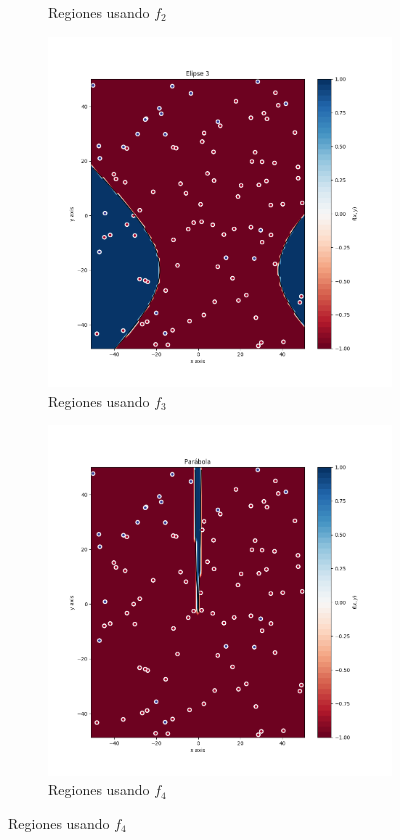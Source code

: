 \documentclass[
  a4paper,
  spanish,
  12pt,
  enlargefirstpage,
]{scrartcl}
\begin{document}
\begin{figure}
\begin{subfigure}{.5\textwidth}
  \caption{Regiones usando \(f_2\)}
  \label{fig:sub2}
\end{subfigure}
\begin{subfigure}{0.5\textwidth}
  \centering
  \includegraphics[width=\linewidth]{img/RegElipse3.png}
  \caption{Regiones usando \(f_3\)}
  \label{fig:sub3}
\end{subfigure}%
\begin{subfigure}{.5\textwidth}
  \centering
  \includegraphics[width=\linewidth]{img/RegParabola.png}
  \caption{Regiones usando \(f_4\)}
  \label{fig:sub4}
\end{subfigure}

\label{fig:reg1}
\end{figure}
\end{document}
